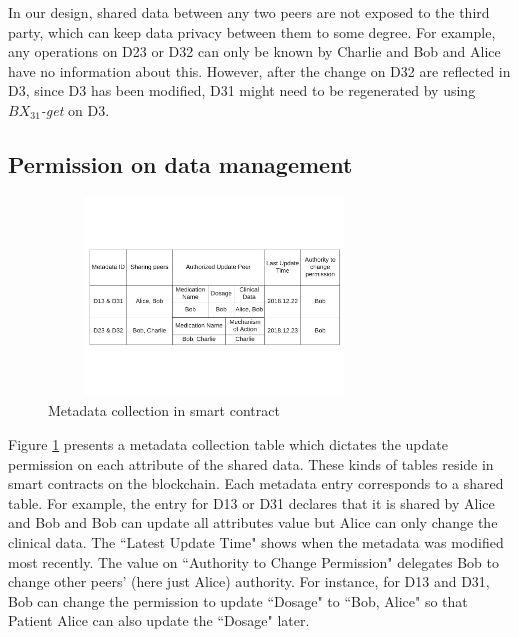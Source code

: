 \documentclass[conference]{IEEEtran}
\begin{document}
In our design, shared data between any two peers are not exposed to the third party, which can keep data privacy between them to some degree. For example, any operations on D23 or D32 can only be known by Charlie and Bob and Alice have no information about this. However, after the change on D32 are reflected in D3, since D3 has been modified, D31 might need to be regenerated by using \emph{$BX_{31}$-get} on D3.


%
%
%

\subsection{Permission on data management}
\label{permission}

\begin{figure}[htbp]
    \centerline{\includegraphics[width=250pt,height=150pt]{metadata.pdf}}
    \caption{Metadata collection in smart contract}
    \label{metadata}
\end{figure}

Figure \ref{metadata} presents a metadata collection table which dictates the update permission on each attribute of the shared data. These kinds of tables reside in smart contracts on the blockchain. Each metadata entry corresponds to a shared table. For example, the entry for D13 or D31 declares that it is shared by Alice and Bob and Bob can update all attributes value but Alice can only change the clinical data. The ``Latest Update Time" shows when the metadata was modified most recently. The value on ``Authority to Change Permission"  delegates Bob to change other peers' (here just Alice) authority. For instance, for D13 and D31, Bob can change the permission to update ``Dosage" to ``Bob, Alice" so that Patient Alice can also update the  ``Dosage" later.
\end{document}
